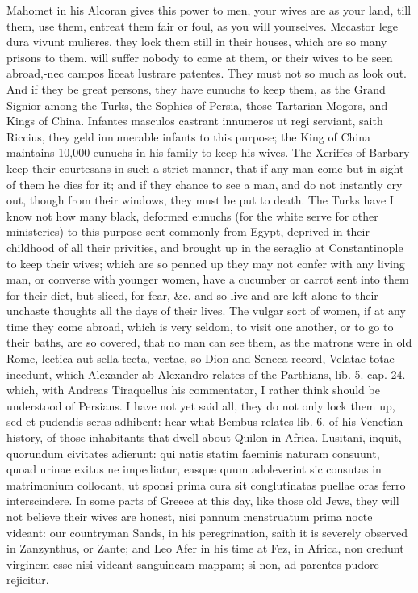 {Mahomet in his Alcoran gives this power to men, your wives are as your
land, till them, use them, entreat them fair or foul, as you will
yourselves. Mecastor lege dura vivunt mulieres, they lock them
still in their houses, which are so many prisons to them. will suffer
nobody to come at them, or their wives to be seen abroad,-nec campos
liceat lustrare patentes. They must not so much as look out. And if
they be great persons, they have eunuchs to keep them, as the Grand
Signior among the Turks, the Sophies of Persia, those Tartarian Mogors,
and Kings of China. Infantes masculos castrant innumeros ut regi
serviant, saith Riccius, they geld innumerable infants to this
purpose; the King of China maintains 10,000 eunuchs in his family
to keep his wives. The Xeriffes of Barbary keep their courtesans in
such a strict manner, that if any man come but in sight of them he dies
for it; and if they chance to see a man, and do not instantly cry out,
though from their windows, they must be put to death. The Turks have I
know not how many black, deformed eunuchs (for the white serve for
other ministeries) to this purpose sent commonly from Egypt, deprived
in their childhood of all their privities, and brought up in the
seraglio at Constantinople to keep their wives; which are so penned up
they may not confer with any living man, or converse with younger
women, have a cucumber or carrot sent into them for their diet, but
sliced, for fear, \&c. and so live and are left alone to their unchaste
thoughts all the days of their lives. The vulgar sort of women, if at
any time they come abroad, which is very seldom, to visit one another,
or to go to their baths, are so covered, that no man can see them, as
the matrons were in old Rome, lectica aut sella tecta, vectae, so
Dion and Seneca record, Velatae totae incedunt, which
Alexander ab Alexandro relates of the Parthians, lib. 5. cap. 24.
which, with Andreas Tiraquellus his commentator, I rather think should
be understood of Persians. I have not yet said all, they do not only
lock them up, sed et pudendis seras adhibent: hear what Bembus relates
lib. 6. of his Venetian history, of those inhabitants that dwell about
Quilon in Africa. Lusitani, inquit, quorundum civitates adierunt: qui
natis statim faeminis naturam consuunt, quoad urinae exitus ne
impediatur, easque quum adoleverint sic consutas in matrimonium
collocant, ut sponsi prima cura sit conglutinatas puellae oras ferro
interscindere. In some parts of Greece at this day, like those old
Jews, they will not believe their wives are honest, nisi pannum
menstruatum prima nocte videant: our countryman Sands, in his
peregrination, saith it is severely observed in Zanzynthus, or Zante;
and Leo Afer in his time at Fez, in Africa, non credunt virginem esse
nisi videant sanguineam mappam; si non, ad parentes pudore rejicitur.

}
